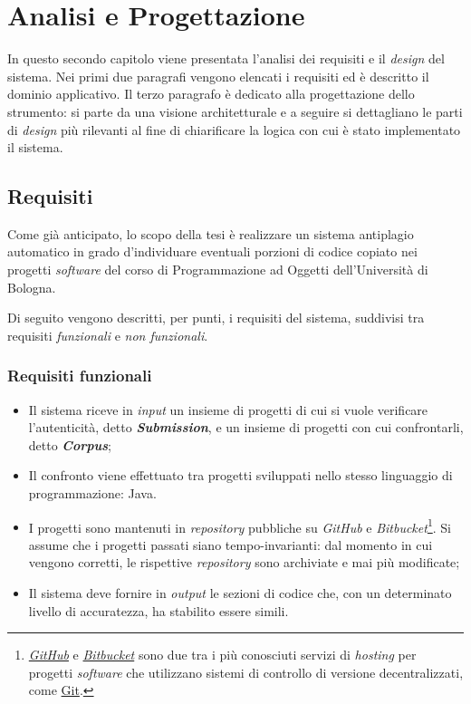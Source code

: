 \chapter{Analisi e Progettazione}
\label{chapter:analysis}
In questo secondo capitolo viene presentata l'analisi dei requisiti e il \textit{design} del sistema.
%
Nei primi due paragrafi vengono elencati i requisiti ed è descritto il dominio applicativo.
%
Il terzo paragrafo è dedicato alla progettazione dello strumento: si parte da una visione architetturale e a seguire si dettagliano le parti di \textit{design} più rilevanti al fine di chiarificare la logica con cui è stato implementato il sistema.

\section{Requisiti}
Come già anticipato, lo scopo della tesi è realizzare un sistema antiplagio automatico in grado d'individuare eventuali porzioni di codice copiato nei progetti \textit{software} del corso di Programmazione ad Oggetti dell'Università di Bologna.

Di seguito vengono descritti, per punti, i requisiti del sistema, suddivisi tra requisiti \textit{funzionali} e \textit{non funzionali}.

\subsection*{Requisiti funzionali}
\begin{itemize}
    \item Il sistema riceve in \textit{input} un insieme di progetti di cui si vuole verificare l'autenticità, detto \textbf{\textit{Submission}}, e un insieme di progetti con cui confrontarli, detto \textbf{\textit{Corpus}};
    
    \item Il confronto viene effettuato tra progetti sviluppati nello stesso linguaggio di programmazione: Java.
    
    \item I progetti sono mantenuti in \textit{repository} pubbliche su \textit{GitHub} e \textit{Bitbucket}\footnote{
        \href{https://github.com}{\textit{GitHub}} e \href{https://bitbucket.org}{\textit{Bitbucket}} sono due tra i più conosciuti servizi di \textit{hosting} per progetti \textit{software} che utilizzano sistemi di controllo di versione decentralizzati, come \href{https://git-scm.com}{Git}.
    }. Si assume che i progetti passati siano tempo-invarianti: dal momento in cui vengono corretti, le rispettive \textit{repository} sono archiviate e mai più modificate;

    \item Il sistema deve fornire in \textit{output} le sezioni di codice che, con un determinato livello di accuratezza, ha stabilito essere simili.
\end{itemize}

